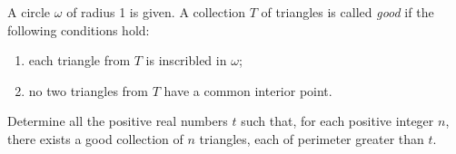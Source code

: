 A circle $\omega$ of radius 1 is given. A collection $T$ of triangles is called \textit{good} if the following conditions hold:

\begin{enumerate}
	\item each triangle from $T$ is inscribled in $\omega$;
	\item no two triangles from $T$ have a common interior point.
\end{enumerate}

Determine all the positive real numbers $t$ such that, for each positive integer $n$, there exists a good collection of $n$ triangles, each of perimeter greater than $t$.